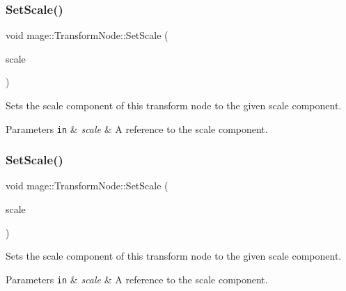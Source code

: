 \subsubsection{\texorpdfstring{Set\+Scale()}{SetScale()}\hspace{0.1cm}{\footnotesize\ttfamily [3/5]}}
{\footnotesize\ttfamily void mage\+::\+Transform\+Node\+::\+Set\+Scale (\begin{DoxyParamCaption}\item[{const X\+M\+F\+L\+O\+A\+T3 \&}]{scale }\end{DoxyParamCaption})\hspace{0.3cm}{\ttfamily [noexcept]}}

Sets the scale component of this transform node to the given scale component.


\begin{DoxyParams}[1]{Parameters}
\mbox{\tt in}  & {\em scale} & A reference to the scale component. \\
\hline
\end{DoxyParams}
\hypertarget{structmage_1_1_transform_node_aaaa992bbd1ebad4b858fcb28ce2781d0}{}\label{structmage_1_1_transform_node_aaaa992bbd1ebad4b858fcb28ce2781d0} 
\subsubsection{\texorpdfstring{Set\+Scale()}{SetScale()}\hspace{0.1cm}{\footnotesize\ttfamily [4/5]}}
{\footnotesize\ttfamily void mage\+::\+Transform\+Node\+::\+Set\+Scale (\begin{DoxyParamCaption}\item[{X\+M\+F\+L\+O\+A\+T3 \&\&}]{scale }\end{DoxyParamCaption})\hspace{0.3cm}{\ttfamily [noexcept]}}

Sets the scale component of this transform node to the given scale component.


\begin{DoxyParams}[1]{Parameters}
\mbox{\tt in}  & {\em scale} & A reference to the scale component. \\
\hline
\end{DoxyParams}
\hypertarget{structmage_1_1_transform_node_ad90daae6725ce76c43429ef5ab90c2da}{}\label{structmage_1_1_transform_node_ad90daae6725ce76c43429ef5ab90c2da} 
